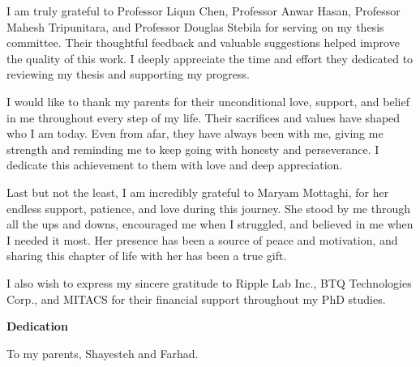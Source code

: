 I am truly grateful to Professor Liqun Chen, Professor Anwar Hasan, Professor Mahesh Tripunitara, and Professor Douglas Stebila for serving on my thesis committee. Their thoughtful feedback and valuable suggestions helped improve the quality of this work. I deeply appreciate the time and effort they dedicated to reviewing my thesis and supporting my progress.

I would like to thank my parents for their unconditional love, support, and belief in me throughout every step of my life. Their sacrifices and values have shaped who I am today. Even from afar, they have always been with me, giving me strength and reminding me to keep going with honesty and perseverance. I dedicate this achievement to them with love and deep appreciation.

Last but not the least, I am incredibly grateful to Maryam Mottaghi, for her endless support, patience, and love during this journey. She stood by me through all the ups and downs, encouraged me when I struggled, and believed in me when I needed it most. Her presence has been a source of peace and motivation, and sharing this chapter of life with her has been a true gift.

I also wish to express my sincere gratitude to Ripple Lab Inc.,  BTQ Technologies Corp., and MITACS for their financial support throughout my PhD studies.

\cleardoublepage
{}    %

\begin{center}\textbf{Dedication}\end{center}

To my parents, Shayesteh and Farhad.
\cleardoublepage
{}    %

\renewcommand\contentsname{Table of Contents}
\tableofcontents
\cleardoublepage
{}    %

\listoffigures
\cleardoublepage
{}		%

\listoftables
\cleardoublepage
{}		%

\renewcommand*{\abbreviationsname}{List of Abbreviations}
\printglossary[type=abbreviations]
\cleardoublepage
{}		%

\printglossary[type=symbols]
\cleardoublepage
{}		%



